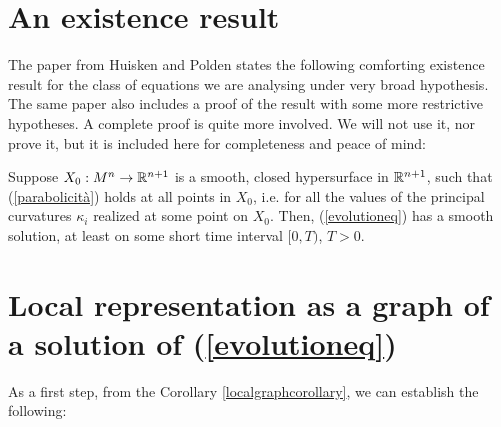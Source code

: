 \section{An existence result}
The paper from Huisken and Polden \cite{huisken} states the following comforting existence result for the class of equations we are analysing under very broad hypothesis. The same paper also includes a proof of the result with some more restrictive hypotheses. A complete proof is quite more involved. We will not use it, nor prove it, but it is included here for completeness and peace of mind: 

\begin{theorem}
Suppose $X_0 : M^n \rightarrow \mathbb{R}^{n+1}$ is a smooth, closed hypersurface in $\mathbb{R}^{n+1}$, such that (\ref{parabolicità}) holds at all points in $X_0$, i.e. for all the values of the principal curvatures $\kappa_{i}$ realized at some point on $X_0$. Then, (\ref{evolutioneq}) has a smooth solution, at least on some short time interval $[0, T)$, $T > 0$.  \label{existence}
\end{theorem}



\section{Local representation as a graph of a solution of (\ref{evolutioneq})}
As a first step, from the Corollary \ref{localgraphcorollary}, we can establish the following:

